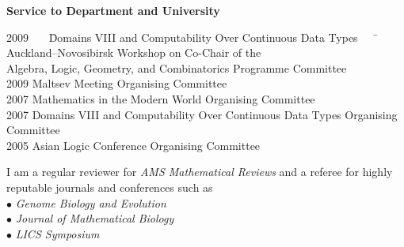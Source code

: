 \documentclass[12pt]{article}
\begin{document}
\centerline{\bf Service to Department and University}
\begin{tabbing}
2009 \ \ \ \= Domains VIII and Computability Over Continuous Data Types \ \ \ \=           \> Auckland--Novosibirsk Workshop on       \> Co-Chair of the \\
              \> Algebra, Logic, Geometry, and Combinatorics      \> Programme Committee \\
2009          \> Maltsev Meeting                          \> Organising Committee\\
2007          \> Mathematics in the Modern World          \> Organising Committee\\
2007          \> Domains VIII and Computability Over Continuous Data Types     \> Organising Committee\\
2005          \> Asian Logic Conference                   \> Organising Committee%
\end{tabbing}

\noindent I am a regular reviewer for {\em AMS Mathematical Reviews} and a referee for highly reputable journals and conferences such as\\
$\bullet$ {\em Genome Biology and Evolution}\\
$\bullet$ {\em Journal of Mathematical Biology}\\
$\bullet$ {\em LICS Symposium}
\vskip30pt
\end{document}
